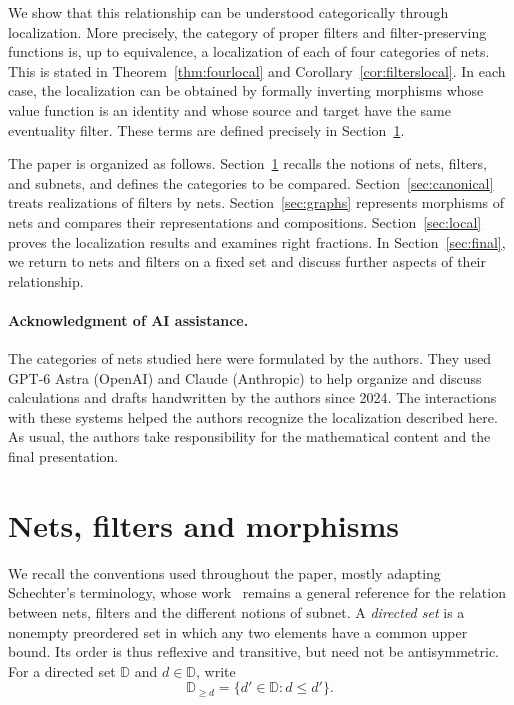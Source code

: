 \documentclass[11pt,a4paper]{article}
\theoremstyle{definition}
\theoremstyle{remark}
\begin{document}
We show that this relationship can be understood categorically through
localization. More precisely, the category of proper filters and
filter-preserving functions is, up to equivalence, a localization of
each of four categories of nets. This is stated in
Theorem~\ref{thm:fourlocal} and Corollary~\ref{cor:filterslocal}. In each case, the
localization can be obtained by formally inverting morphisms whose
value function is an identity and whose source and target have the
same eventuality filter. These terms are defined precisely in
Section~\ref{sec:categories}.

The paper is organized as follows.
Section~\ref{sec:categories} recalls the notions of nets, filters, and
subnets, and defines the categories to be compared.
Section~\ref{sec:canonical} treats realizations of filters by nets.
Section~\ref{sec:graphs} represents morphisms of nets and compares
their representations and compositions.
Section~\ref{sec:local} proves the localization results and examines
right fractions. In Section~\ref{sec:final}, we return to nets and filters
on a fixed set and discuss further aspects of their relationship.

\begin{samepage}
\paragraph{Acknowledgment of AI assistance.}
The categories of nets studied here were formulated by the authors.
They used GPT-6 Astra (OpenAI) and Claude
(Anthropic) to help organize and discuss calculations and drafts
handwritten by the authors since 2024. The interactions with these
systems helped the authors recognize the localization described here.
As usual, the authors take responsibility for the mathematical content
and the final presentation.\par
\end{samepage}

\section{Nets, filters and morphisms}\label{sec:categories}
We recall the conventions used throughout the paper, mostly adapting
Schechter's terminology, whose work~\cite[Chapter 7]{Schechter}
remains a general reference for the relation between nets, filters
and the different notions of subnet.
A \emph{directed set} is a nonempty preordered set in which any two
elements have a common upper bound. Its order is thus reflexive and
transitive, but need not be antisymmetric. For a directed set \(\mathbb{D}\)
and \(d\in\mathbb{D}\), write
\[
 \mathbb{D}_{\ge d}=\{d'\in \mathbb{D}:d\le d'\}.
\]
\end{document}
